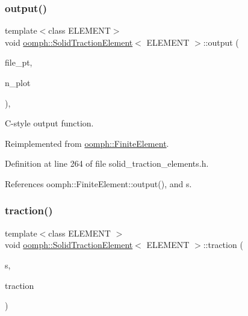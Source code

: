 \mbox{\label{classoomph_1_1SolidTractionElement_ae96f69a6485b2f788a60f139abc0a93f}} 
\subsubsection{\texorpdfstring{output()}{output()}\hspace{0.1cm}{\footnotesize\ttfamily [4/4]}}
{\footnotesize\ttfamily template$<$class E\+L\+E\+M\+E\+NT$>$ \\
void \hyperlink{classoomph_1_1SolidTractionElement}{oomph\+::\+Solid\+Traction\+Element}$<$ E\+L\+E\+M\+E\+NT $>$\+::output (\begin{DoxyParamCaption}\item[{F\+I\+LE $\ast$}]{file\+\_\+pt,  }\item[{const unsigned \&}]{n\+\_\+plot }\end{DoxyParamCaption})\hspace{0.3cm}{\ttfamily [inline]}, {\ttfamily [virtual]}}



C-\/style output function. 



Reimplemented from \hyperlink{classoomph_1_1FiniteElement_adfaee690bb0608f03320eeb9d110d48c}{oomph\+::\+Finite\+Element}.



Definition at line 264 of file solid\+\_\+traction\+\_\+elements.\+h.



References oomph\+::\+Finite\+Element\+::output(), and s.

\mbox{\label{classoomph_1_1SolidTractionElement_ab00a3429962eb33612054e82095f8082}} 
\subsubsection{\texorpdfstring{traction()}{traction()}}
{\footnotesize\ttfamily template$<$class E\+L\+E\+M\+E\+NT $>$ \\
void \hyperlink{classoomph_1_1SolidTractionElement}{oomph\+::\+Solid\+Traction\+Element}$<$ E\+L\+E\+M\+E\+NT $>$\+::traction (\begin{DoxyParamCaption}\item[{const \hyperlink{classoomph_1_1Vector}{Vector}$<$ double $>$ \&}]{s,  }\item[{\hyperlink{classoomph_1_1Vector}{Vector}$<$ double $>$ \&}]{traction }\end{DoxyParamCaption})}



